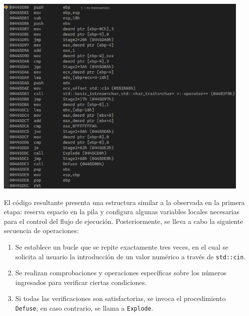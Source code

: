 \documentclass[11pt,a4paper]{article}
\begin{document}
\begin{center}
\includegraphics[width=0.95\textwidth]{s2-1.png}
\end{center}

\noindent El código resultante presenta una estructura similar a la observada en la primera etapa: reserva espacio en la pila y configura algunas variables locales necesarias para el control del flujo de ejecución. Posteriormente, se lleva a cabo la siguiente secuencia de operaciones:

\begin{enumerate}
  \item Se establece un bucle que se repite exactamente tres veces, en el cual se solicita al usuario la introducción de un valor numérico a través de \texttt{std::cin}.
  \item Se realizan comprobaciones y operaciones específicas sobre los números ingresados para verificar ciertas condiciones.
  \item Si todas las verificaciones son satisfactorias, se invoca el procedimiento \texttt{Defuse}; en caso contrario, se llama a \texttt{Explode}.
\end{enumerate}
\end{document}
